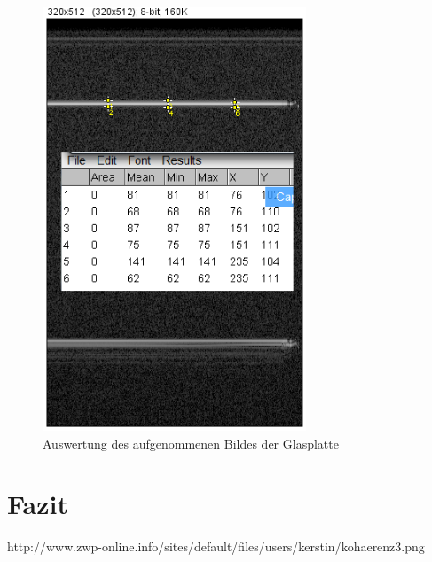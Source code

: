 \documentclass[german, %
parskip=full, %
bibliography=totoc, %
]{scrartcl}
\begin{document}
\begin{figure}[ht] 
  \centering
     \includegraphics[width=0.7\textwidth]{Glasplatte_Auswertung}
  \caption{Auswertung des aufgenommenen Bildes der Glasplatte}
  \label{fig:glasplatte}
\end{figure}



\section{Fazit}


\begin{thebibliography}{9}

  http://www.zwp-online.info/sites/default/files/users/kerstin/kohaerenz3.png

\end{thebibliography}
\end{document}
